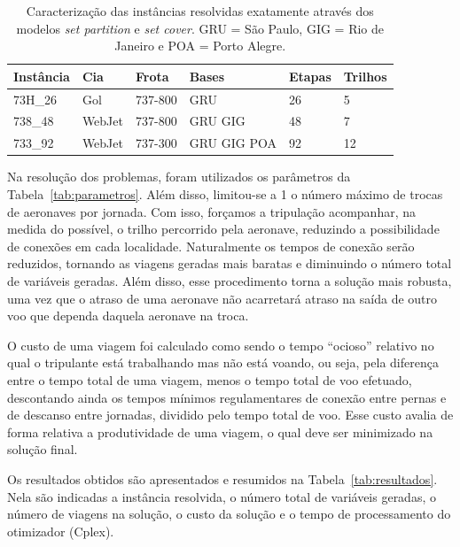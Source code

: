 \begin{table}[htb]
	\begin{center} 
		\begin{tabular}{|l|l|l|l|l|l|}
			\hline 
			{\bf Instância} & {\bf Cia} & {\bf Frota} & {\bf Bases} & {\bf Etapas} & {\bf Trilhos} \\ 
			\hline \hline
			73H\_26 & Gol & 737-800 & GRU & 26 & 5 \\ 
			738\_48 & WebJet & 737-800 & GRU GIG & 48 & 7 \\ 
			733\_92 & WebJet & 737-300 & GRU GIG POA & 92 & 12 \\ \hline
		\end{tabular}
		\caption{Caracterização das instâncias resolvidas exatamente através dos modelos 
		{\it set partition} e {\it set cover}. GRU = São Paulo, GIG = Rio de Janeiro e 
		POA = Porto Alegre.}
		\label{tab:instancias}
	\end{center}
\end{table}

Na resolução dos problemas, foram utilizados os parâmetros da Tabela~\ref{tab:parametros}. Além
disso, limitou-se a 1 o número máximo de trocas de aeronaves por jornada. Com isso, forçamos a
tripulação acompanhar, na medida do possível, o trilho percorrido pela aeronave, reduzindo a
possibilidade de conexões em cada localidade. Naturalmente os tempos de conexão serão reduzidos,
tornando as viagens geradas mais baratas e diminuindo o número total de variáveis geradas. Além
disso, esse procedimento torna a solução mais robusta, uma vez que o atraso de uma aeronave não
acarretará atraso na saída de outro voo que dependa daquela aeronave na troca.

O custo de uma viagem foi calculado como sendo o tempo ``ocioso'' relativo no qual o tripulante está 
trabalhando mas não está voando, ou seja, pela diferença entre o tempo total de uma viagem, menos o 
tempo total de voo efetuado, descontando ainda os tempos mínimos regulamentares de conexão entre 
pernas e de descanso entre jornadas, dividido pelo tempo total de voo. Esse custo avalia de forma 
relativa a produtividade de uma viagem, o qual deve ser minimizado na solução final.

Os resultados obtidos são apresentados e resumidos na Tabela~\ref{tab:resultados}. Nela são 
indicadas a instância resolvida, o número total de variáveis geradas, o número de viagens na 
solução, o custo da solução e o tempo de processamento do otimizador (Cplex).

